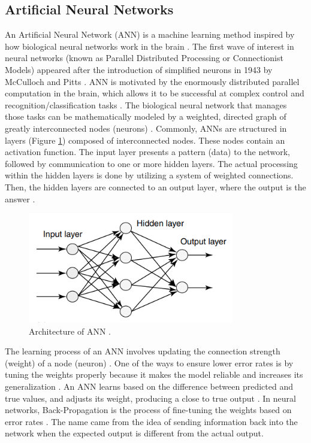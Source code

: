 \documentclass[12pt]{diazessay}
\begin{document}
    \subsection{Artificial Neural Networks}
    \hspace{0.7cm} An Artificial Neural Network (ANN) is a machine learning method inspired by how biological neural networks work in the brain \cite{Goodfellow-et-al-2016}. The first wave of interest in neural networks (known as Parallel Distributed Processing or Connectionist Models) appeared after the introduction of simplified neurons in 1943 by McCulloch and Pitts \cite{abraham2005artificial}.   ANN is motivated by the enormously distributed parallel computation in the brain, which allows it to be successful at complex control and recognition/classification tasks \cite{hassoun1995fundamentals}.
    The biological neural network that manages those tasks can be mathematically modeled by a weighted, directed graph of greatly interconnected nodes (neurons) \cite{hassoun1995fundamentals}.   
    Commonly, ANNs are structured in layers (Figure \ref{fig:ANNs layers}) composed of interconnected nodes. These nodes contain an activation function.
    The input layer presents a pattern (data) to the network, followed by communication to one or more hidden layers. The actual processing within the hidden layers is done by utilizing a system of weighted connections. Then, the hidden layers are connected to an output layer, where the output is the answer \cite{bartzatt2014determination}. 
    \begin{figure}[H]
        \centering
        \includegraphics[width=9cm]{Figures/ANN_layers.PNG}
        \caption[Architecture of ANN]{Architecture of ANN \cite{abraham2005artificial}.}
        \label{fig:ANNs layers}
    \end{figure} 
    \hspace{0.3cm}The learning process of an ANN involves updating the connection strength (weight) of a node (neuron) \cite{han2018artificial}.
    One of the ways to ensure lower error rates is by tuning the weights properly because it makes the model reliable and increases its generalization \cite{gnanasekaran2022ground}. An ANN learns based on the difference between predicted and true values, and adjusts its weight, producing a close to true output \cite{han2018artificial}. In neural networks, Back-Propagation is the process of fine-tuning the weights based on error rates \cite{gnanasekaran2022ground}. The name came from the idea of sending information back into the network when the expected output is different from the actual output. 
\end{document}
